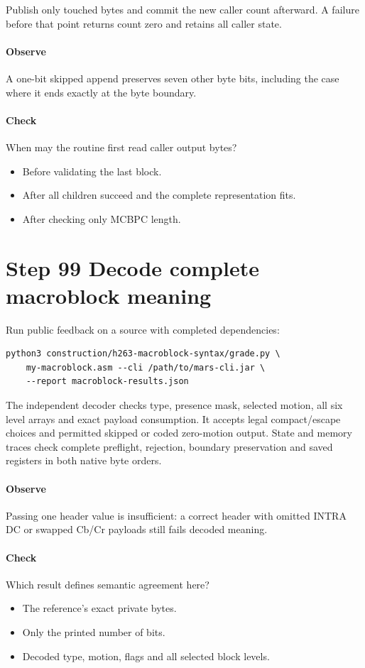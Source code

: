 Publish only touched bytes and commit the new caller count afterward. A failure
before that point returns count zero and retains all caller state.

\paragraph{Observe} A one-bit skipped append preserves seven other byte bits,
including the case where it ends exactly at the byte boundary.
\paragraph{Check} When may the routine first read caller output bytes?
\begin{itemize}
  \item[A.] Before validating the last block.
  \item[B.] After all children succeed and the complete representation fits.
  \item[C.] After checking only MCBPC length.
\end{itemize}

\section{Step 99 Decode complete macroblock meaning}\label{h263-syntax-s09}
Run public feedback on a source with completed dependencies:
\begin{verbatim}
python3 construction/h263-macroblock-syntax/grade.py \
    my-macroblock.asm --cli /path/to/mars-cli.jar \
    --report macroblock-results.json
\end{verbatim}
The independent decoder checks type, presence mask, selected motion, all six
level arrays and exact payload consumption. It accepts legal compact/escape
choices and permitted skipped or coded zero-motion output. State and memory traces
check complete preflight, rejection, boundary preservation and saved registers
in both native byte orders.

\paragraph{Observe} Passing one header value is insufficient: a correct header
with omitted INTRA DC or swapped Cb/Cr payloads still fails decoded meaning.
\Needspace{8\baselineskip}
\paragraph{Check} Which result defines semantic agreement here?
\begin{itemize}
  \item[A.] The reference's exact private bytes.
  \item[B.] Only the printed number of bits.
  \item[C.] Decoded type, motion, flags and all selected block levels.
\end{itemize}

